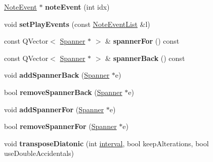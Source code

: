 \begin{DoxyCompactItemize}
\mbox{\label{class_ms_1_1_note_af368bb4900698d8e393dfec1abc7d6e6}} 
\hyperlink{class_ms_1_1_note_event}{Note\+Event} $\ast$ {\bfseries note\+Event} (int idx)
\item 
\mbox{\label{class_ms_1_1_note_a7d3c4850c5f7957394cce53085f83c67}} 
void {\bfseries set\+Play\+Events} (const \hyperlink{class_ms_1_1_note_event_list}{Note\+Event\+List} \&l)
\item 
\mbox{\label{class_ms_1_1_note_ad85cf645f375f12d682c28243dedf029}} 
const Q\+Vector$<$ \hyperlink{class_ms_1_1_spanner}{Spanner} $\ast$ $>$ \& {\bfseries spanner\+For} () const
\item 
\mbox{\label{class_ms_1_1_note_a7e2a07630dad78f0911a16be88e16729}} 
const Q\+Vector$<$ \hyperlink{class_ms_1_1_spanner}{Spanner} $\ast$ $>$ \& {\bfseries spanner\+Back} () const
\item 
\mbox{\label{class_ms_1_1_note_a867b372fb90830b22bfe0d26d0675138}} 
void {\bfseries add\+Spanner\+Back} (\hyperlink{class_ms_1_1_spanner}{Spanner} $\ast$e)
\item 
\mbox{\label{class_ms_1_1_note_a97575ef0255cb4b9cde48b6c8730a00f}} 
bool {\bfseries remove\+Spanner\+Back} (\hyperlink{class_ms_1_1_spanner}{Spanner} $\ast$e)
\item 
\mbox{\label{class_ms_1_1_note_a8aabb10d91e08035ebe0f9cbc6d55729}} 
void {\bfseries add\+Spanner\+For} (\hyperlink{class_ms_1_1_spanner}{Spanner} $\ast$e)
\item 
\mbox{\label{class_ms_1_1_note_a8079a2be644aa231ba874647bbd871fd}} 
bool {\bfseries remove\+Spanner\+For} (\hyperlink{class_ms_1_1_spanner}{Spanner} $\ast$e)
\item 
\mbox{\label{class_ms_1_1_note_a989f08021238763c558e87e9f7478c67}} 
void {\bfseries transpose\+Diatonic} (int \hyperlink{class_interval}{interval}, bool keep\+Alterations, bool use\+Double\+Accidentals)
\item 
\mbox{\label{class_ms_1_1_note_add9227fecc6cfe4a01692278b177d7fa}} 

\end{DoxyCompactItemize}

